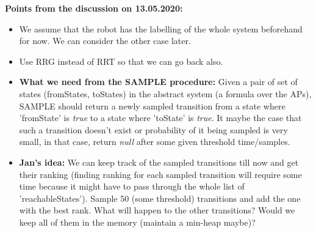 \documentclass{article}
\newcommand{\kush}[1]{{\color{blue} #1}}
\begin{document}
\vspace{20pt}
\textbf{Points from the discussion on 13.05.2020:}
	\begin{itemize}
		\item We assume that the robot has the labelling of the whole system beforehand for now. We can consider the other case later.
		\item Use RRG instead of RRT so that we can go back also.
		\item \textbf{What we need from the SAMPLE procedure:} Given a pair of set of states (fromStates, toStates) in the abstract system (a formula over the APs), SAMPLE should return a newly sampled transition from a state where 'fromState' is \textit{true} to a state where 'toState' is \textit{true}. It maybe the case that such a transition doesn't exist or probability of it being sampled is very small, in that case, return \emph{null} after some given threshold time/samples.
		\item \textbf{Jan's idea:} We can keep track of the sampled transitions till now and get their ranking (finding ranking for each sampled transition will require some time because it might have to pass through the whole list of 'reachableStates'). Sample 50 (some threshold) transitions and add the one with the best rank. \kush{What will happen to the other transitions? Would we keep all of them in the memory (maintain a min-heap maybe)?}
	\end{itemize}
\end{document}
